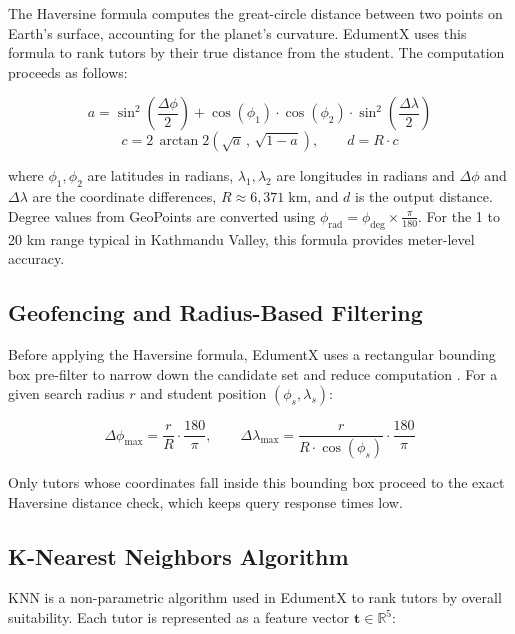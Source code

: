 \documentclass[12pt]{report}
\begin{document}
The Haversine formula computes the great-circle distance
between two points on Earth's surface, accounting for the
planet's curvature. EdumentX uses this formula to rank tutors
by their true distance from the student. The computation
proceeds as follows:

\begin{equation}
a = \sin^2\!\left(\frac{\Delta\phi}{2}\right) +
\cos(\phi_1)\cdot\cos(\phi_2)\cdot\sin^2\!\left(\frac{\Delta\lambda}{2}\right)
\end{equation}
\begin{equation}
c = 2\,\arctan2\!\left(\sqrt{a}\,,\,\sqrt{1-a}\right), \qquad
d = R \cdot c
\end{equation}

\noindent where $\phi_1, \phi_2$ are latitudes in radians,
$\lambda_1, \lambda_2$ are longitudes in radians and
$\Delta\phi$ and $\Delta\lambda$ are the coordinate
differences, $R \approx 6{,}371\;\text{km}$, and $d$ is the
output distance. Degree values from GeoPoints are converted
using $\phi_{\text{rad}} = \phi_{\text{deg}} \times
\frac{\pi}{180}$. For the 1 to 20 km range typical in
Kathmandu Valley, this formula provides meter-level accuracy.

\subsection{Geofencing and Radius-Based Filtering}

Before applying the Haversine formula, EdumentX uses a
rectangular bounding box pre-filter to narrow down the
candidate set and reduce computation
\citep{Shevchenko2023Geofencing}. For a given search radius
$r$ and student position $(\phi_s, \lambda_s)$:

\begin{equation}
\Delta\phi_{\max} = \frac{r}{R} \cdot \frac{180}{\pi}, \qquad
\Delta\lambda_{\max} = \frac{r}{R \cdot \cos(\phi_s)} \cdot \frac{180}{\pi}
\end{equation}

\noindent Only tutors whose coordinates fall inside this
bounding box proceed to the exact Haversine distance check,
which keeps query response times low.

\subsection{K-Nearest Neighbors Algorithm}

KNN is a non-parametric algorithm used in EdumentX to rank
tutors by overall suitability. Each tutor is represented as a
feature vector $\mathbf{t} \in \mathbb{R}^5$:
\end{document}
